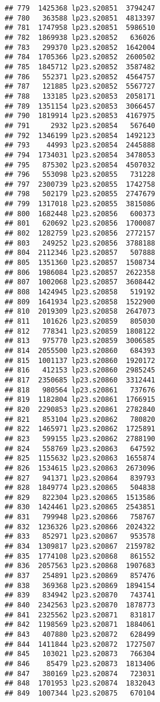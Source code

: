 \documentclass[
]{article}
\begin{document}
\begin{verbatim}
## 779  1425368 lp23.s20851  3794247
## 780   363588 lp23.s20851  4813397
## 781  1747958 lp23.s20851  5986510
## 782  1869938 lp23.s20852   636026
## 783   299370 lp23.s20852  1642004
## 784  1705366 lp23.s20852  2600502
## 785  1845712 lp23.s20852  3587482
## 786   552371 lp23.s20852  4564757
## 787   121885 lp23.s20852  5567727
## 788   133185 lp23.s20853  2058171
## 789  1351154 lp23.s20853  3066457
## 790  1819914 lp23.s20853  4167975
## 791     2932 lp23.s20854   567640
## 792  1346199 lp23.s20854  1492123
## 793    44993 lp23.s20854  2445888
## 794  1734031 lp23.s20854  3478053
## 795   875302 lp23.s20854  4507032
## 796   553098 lp23.s20855   731228
## 797  2300739 lp23.s20855  1742758
## 798   502179 lp23.s20855  2747679
## 799  1317018 lp23.s20855  3815086
## 800  1682448 lp23.s20856   600373
## 801   620692 lp23.s20856  1700087
## 802  1282759 lp23.s20856  2772157
## 803   249252 lp23.s20856  3788188
## 804  2112346 lp23.s20857   507888
## 805  1351360 lp23.s20857  1508734
## 806  1986084 lp23.s20857  2622358
## 807  1002068 lp23.s20857  3608442
## 808  1424945 lp23.s20858   519192
## 809  1641934 lp23.s20858  1522900
## 810  2019309 lp23.s20858  2647073
## 811   101626 lp23.s20859   805030
## 812   778341 lp23.s20859  1808122
## 813   975770 lp23.s20859  3006585
## 814  2055500 lp23.s20860   684393
## 815  1001137 lp23.s20860  1920172
## 816   412153 lp23.s20860  2985245
## 817  2350685 lp23.s20860  3312441
## 818   980564 lp23.s20861   737676
## 819  1182804 lp23.s20861  1766915
## 820  2290853 lp23.s20861  2782840
## 821   853104 lp23.s20862   780820
## 822  1465971 lp23.s20862  1725891
## 823   599155 lp23.s20862  2788190
## 824   558769 lp23.s20863   647592
## 825  1155632 lp23.s20863  1655874
## 826  1534615 lp23.s20863  2673096
## 827   941371 lp23.s20864   839793
## 828  1849774 lp23.s20865   504838
## 829   822304 lp23.s20865  1513586
## 830  1424461 lp23.s20865  2543851
## 831   799948 lp23.s20866   758767
## 832  1236326 lp23.s20866  2024322
## 833   852971 lp23.s20867   953578
## 834  1309817 lp23.s20867  2159782
## 835  1774108 lp23.s20868   861552
## 836  2057563 lp23.s20868  1907683
## 837   254891 lp23.s20869   857476
## 838   369368 lp23.s20869  1894154
## 839   834942 lp23.s20870   743741
## 840  2342563 lp23.s20870  1878773
## 841  2325562 lp23.s20871   831817
## 842  1198569 lp23.s20871  1884061
## 843   407880 lp23.s20872   628499
## 844  1411844 lp23.s20872  1727507
## 845   103021 lp23.s20873   766304
## 846    85479 lp23.s20873  1813406
## 847   380169 lp23.s20874   723031
## 848  1701953 lp23.s20874  1832043
## 849  1007344 lp23.s20875   670104

\end{verbatim}
\end{document}
